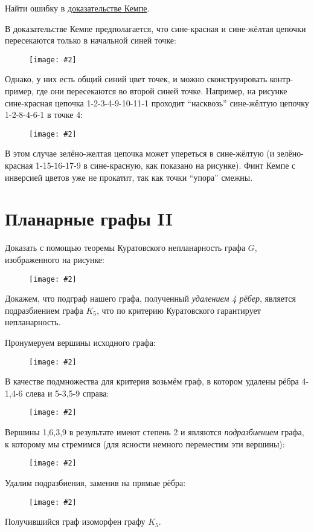\documentclass[a4paper,12pt]{article}
\numberwithin{figure}{section}
\newcommand\CenterFigure[2]{\begin{figure}[H]\centering\texttt{[image: \#2]}\end{figure}}
\begin{document}
\begin{problem}
	Найти ошибку в \href{https://stepik.org/lesson/12347/step/9}{доказательстве Кемпе}.
\end{problem}
\begin{solution}
	В доказательстве Кемпе предполагается, что сине-красная и сине-жёлтая цепочки пересекаются только в начальной синей точке:
		\CenterFigure{9cm}{kempe-proof-idea.png}
	Однако, у них есть общий синий цвет точек, и можно сконструировать контр-пример, где они пересекаются во второй синей точке. Например, на рисунке сине-красная цепочка 1-2-3-4-9-10-11-1 проходит ``насквозь'' сине-жёлтую цепочку 1-2-8-4-6-1 в точке 4:
		\CenterFigure{9cm}{kempe-proof-error2.png}
	В этом случае зелёно-желтая цепочка может упереться в сине-жёлтую (и зелёно-красная 1-15-16-17-9 в сине-красную, как показано на рисунке). Финт Кемпе с инверсией цветов уже не прокатит, так как точки ``упора'' смежны.
\end{solution}



\section{Планарные графы II}


\begin{problem}
	Доказать с помощью теоремы Куратовского непланарность графа $G$, изображенного на рисунке:
		\CenterFigure{4cm}{kuratovsky-task1-stage0.png}
\end{problem}
\begin{solution}
	Докажем, что подграф нашего графа, полученный \textit{удалением 4 рёбер}, является подразбиением графа $K_5$, что по критерию Куратовского гарантирует непланарность.

	Пронумеруем вершины исходного графа:
		\CenterFigure{6cm}{kuratovsky-task1-stage1.png}
	В качестве подмножества для критерия возьмём граф, в котором удалены рёбра 4-1,4-6 слева и 5-3,5-9 справа:
		\CenterFigure{6cm}{kuratovsky-task1-stage2.png}
	Вершины 1,6,3,9 в результате имеют степень 2 и являются \textit{подразбиением} графа, к которому мы стремимся (для ясности немного переместим эти вершины):
		\CenterFigure{6cm}{kuratovsky-task1-stage3.png}
	Удалим подразбиения, заменив на прямые рёбра:
		\CenterFigure{6cm}{kuratovsky-task1-stage4.png}
	Получившийся граф изоморфен графу $K_5$.
\end{solution}
\end{document}
